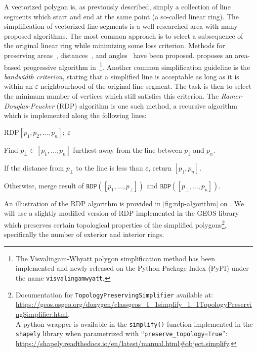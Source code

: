 A vectorized polygon is, as previously described, simply a collection of line segments which start and end at the same point (a so-called linear ring).
The simplification of vectorized line segments is a well researched area with many proposed algorithms.
The most common approach is to select a subsequence of the original linear ring while minimizing some loss criterion.
Methods for preserving areas~\cite{ls-area-preserving}, distances~\cite{ls-distance-preserving}, and angles~\cite{ls-angle-preserving} have been proposed.
\citeauthor{ls-vw} proposes an area-based progressive algorithm in~\cite{ls-vw}\footnote{The Visvalingam-Whyatt polygon simplification method has been implemented and newly released on the Python Package Index (PyPI) under the name \texttt{visvalingamwyatt}.}.
Another common simplification guideline is the \textit{bandwidth criterion}, stating that a simplified line is acceptable as long as it is within an $\varepsilon$-neighbourhood of the original line segment.
The task is then to select the minimum number of vertices which still satisfies this criterion.
The \textit{Ramer-Douglas-Peucker} (RDP) algorithm\cite{ls-rdp} is one such method, a recursive algorithm which is implemented along the following lines:
\begin{pseudofunc}{RDP}{$[p_1, p_2, \ldots, p_n];~\varepsilon$}
  \item Find $p_{\perp} \in [p_1, \ldots, p_n]$ furthest away from the line between $p_1$ and $p_n$.
  \item If the distance from $p_{\perp}$ to the line is less than $\varepsilon$, return $[p_1, p_n]$.
  \item Otherwise, merge result of $\texttt{RDP}([p_1, \ldots, p_{\perp}])$ and $\texttt{RDP}([p_{\perp}, \ldots, p_n])$.
\end{pseudofunc}
An illustration of the RDP algorithm is provided in \cref{fig:rdp-algorithm} on .
We will use a slightly modified version of RDP implemented in the GEOS library which preserves certain topological properties of the simplified polygons\footnote{Documentation for \texttt{TopologyPreservingSimplifier} available at: \url{https://geos.osgeo.org/doxygen/classgeos_1_1simplify_1_1TopologyPreservingSimplifier.html}.\\A python wrapper is available in the \texttt{simplify()} function implemented in the \texttt{shapely} library when parametrized with \enquote{\texttt{preserve\_topology=True}}: \url{https://shapely.readthedocs.io/en/latest/manual.html\#object.simplify}.}, specifically the number of exterior and interior rings.
